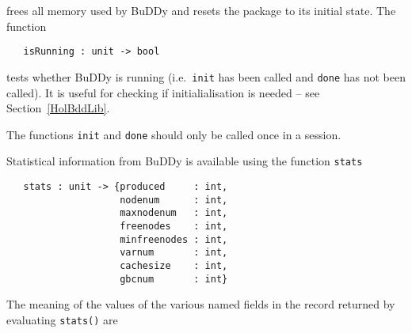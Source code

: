 \documentclass[12pt]{article}
\newcommand{\bnind}[1]{\index[MLbn]{#1}}
\renewcommand{\t}[1]{\mbox{\tt #1}}
\newcommand{\ty}[1]{\mbox{\tt #1}}
\newcommand{\ml}[1]{{\tt #1}}
\newcommand{\Buddy}{BuDDy\xspace}
\newcommand\fun{\mbox{\tt{->}}}
\begin{document}
frees all memory used by \Buddy{} and resets the
package to its initial state. 
The function


%
%

\begin{verbatim}
   isRunning : unit -> bool
\end{verbatim}\bnind{\ml{isRunning}}

tests whether
\Buddy{} is running (i.e.~\t{init} has been called and \t{done} has not been called). It is
useful for checking if initialialisation is needed -- see Section~\ref{HolBddLib}.

The functions \t{init} and \t{done} should only be called once in a session.

Statistical information from \Buddy{} is available
using the function \t{stats}

%
%
%
%
%

\begin{verbatim}
   stats : unit -> {produced     : int,
                    nodenum      : int,
                    maxnodenum   : int,
                    freenodes    : int,
                    minfreenodes : int,
                    varnum       : int,
                    cachesize    : int,
                    gbcnum       : int}
\end{verbatim}\bnind{\ml{stats}}

The meaning of the values of the various named fields in the record returned by
evaluating \t{stats()} are
\end{document}
